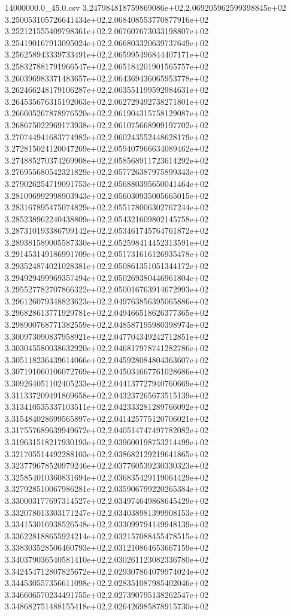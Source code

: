\begin{filecontents*}{14000000.0_45.0.csv}
3.247984818759869086e+02,2.069205962599398845e+02
3.250053105726641434e+02,2.068408553770877916e+02
3.252121555409798361e+02,2.067607673033198807e+02
3.254190167913095024e+02,2.066803320639737649e+02
3.256258943339733491e+02,2.065995496844407171e+02
3.258327881791966547e+02,2.065184201901565757e+02
3.260396983371483657e+02,2.064369436065953778e+02
3.262466248179106287e+02,2.063551199592984631e+02
3.264535676315192063e+02,2.062729492738271801e+02
3.266605267878976520e+02,2.061904315758129087e+02
3.268675022969173938e+02,2.061075668909197702e+02
3.270744941683774982e+02,2.060243552448628179e+02
3.272815024120047269e+02,2.059407966634089462e+02
3.274885270374269908e+02,2.058568911723614292e+02
3.276955680542321829e+02,2.057726387975899343e+02
3.279026254719091753e+02,2.056880395650041464e+02
3.281096992998903943e+02,2.056030935005665015e+02
3.283167895475074829e+02,2.055178006302767244e+02
3.285238962240438809e+02,2.054321609802145758e+02
3.287310193386799142e+02,2.053461745764761872e+02
3.289381589005587330e+02,2.052598414452313591e+02
3.291453149186991709e+02,2.051731616126935478e+02
3.293524874021028381e+02,2.050861351051344172e+02
3.294929499969357494e+02,2.050269380446961804e+02
3.295527782707866322e+02,2.050016763914672993e+02
3.296126079348823623e+02,2.049763856395065886e+02
3.296828613771929781e+02,2.049466518626377365e+02
3.298900768771382559e+02,2.048587195980398974e+02
3.300973090837958921e+02,2.047704349242712851e+02
3.303045580038632920e+02,2.046817978741282786e+02
3.305118236439614066e+02,2.045928084804363607e+02
3.307191060106072769e+02,2.045034667761028686e+02
3.309264051102405233e+02,2.044137727940760669e+02
3.311337209491869658e+02,2.043237265673515139e+02
3.313410535337103511e+02,2.042333281289766092e+02
3.315484028699565897e+02,2.041425775120706021e+02
3.317557689639949672e+02,2.040514747497782082e+02
3.319631518217930193e+02,2.039600198753214499e+02
3.321705514492288103e+02,2.038682129219641865e+02
3.323779678520979246e+02,2.037760539230330323e+02
3.325854010360831694e+02,2.036835429119064429e+02
3.327928510067986281e+02,2.035906799220265384e+02
3.330003177697314527e+02,2.034974649868645429e+02
3.332078013303171247e+02,2.034038981399908153e+02
3.334153016938526548e+02,2.033099794149948139e+02
3.336228188655924214e+02,2.032157088455478515e+02
3.338303528506460793e+02,2.031210864653667159e+02
3.340379036540581410e+02,2.030261123082336780e+02
3.342454712807825672e+02,2.029307864079974024e+02
3.344530557356611098e+02,2.028351087985402046e+02
3.346606570234491755e+02,2.027390795138262547e+02
3.348682751488155418e+02,2.026426985878915730e+02

\end{filecontents*}

